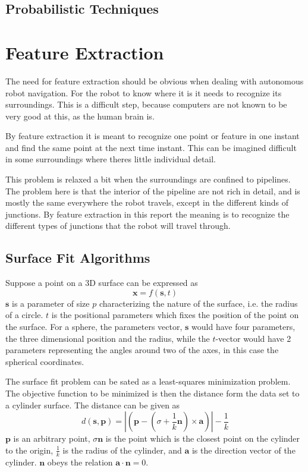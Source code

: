 \subsection{Probabilistic Techniques}



\section{Feature Extraction}
The need for feature extraction should be obvious when dealing with autonomous robot
navigation. For the robot to know where it is it needs to recognize its surroundings. This
is a difficult step, because computers are not known to be very good at this, as the human
brain is. 

By feature extraction it is meant to recognize one point or feature in one instant and
find the same point at the next time instant. This can be imagined difficult in some
surroundings where theres little individual detail. 

This problem is relaxed a bit when the surroundings are confined to pipelines. The problem
here is that the interior of the pipeline are not rich in detail, and is mostly the same
everywhere the robot travels, except in the different kinds of junctions. By feature
extraction in this report the meaning is to recognize the different types of junctions
that the robot will travel through. 
\cite{theilemann-breivik}



\subsection{Surface Fit Algorithms}
Suppose a point on a 3D surface can be expressed as
\begin{equation}
    \mathbf{x} = f(\mathbf{s}, t)
\end{equation}
$\mathbf{s}$ is a parameter of size $p$ characterizing the nature of the surface, i.e. the
radius of a circle. $t$ is the positional parameters which fixes the position of the point
on the surface. For a sphere, the parameters vector, $\mathbf{s}$ would have four parameters,
the three dimensional position and the radius, while the $t$-vector would have 2
parameters representing the angles around two of the axes, in this case the spherical
coordinates.

The surface fit problem can be sated as a least-squares minimization problem. The
objective function to be minimized is then the distance form the data set to a cylinder
surface. The distance can be given as 
\begin{equation}
    d( \mathbf{s}, \mathbf{p})  = | ( \mathbf{p} - (\sigma + \frac{1}{k} \mathbf{n})
    \times \mathbf{a})| - \frac{1}{k}
\end{equation}
$\mathbf{p}$ is an arbitrary point, $\sigma \mathbf{n}$ is the point which is the closest
point on the cylinder to the origin, $\frac{1}{k}$ is the radius of the cylinder, and $\mathbf{a}$ is the
direction vector of the cylinder. $\mathbf{n}$ obeys the relation $\mathbf{a} \cdot
\mathbf{n} = 0$. 

